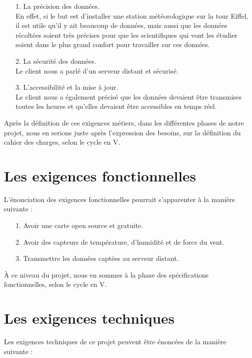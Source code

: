 \documentclass[titlepage]{article}
\begin{document}
	\begin{itemize}
		\item[1.] La précision des données. \\
		En effet, si le but est d'installer une station météorologique sur la tour Eiffel, il est utile qu'il y ait beaucoup de données, mais aussi que les données récoltées soient très précises pour que les scientifiques qui vont les étudier soient dans le plus grand confort pour travailler sur ces données.

		\item[2.] La sécurité des données. \\
		Le client nous a parlé d'un serveur distant et sécurisé.

		\item[3.] L'accessibilité et la mise à jour. \\
		Le client nous a également précisé que les données devaient être transmises toutes les heures et qu’elles devaient être accessibles en temps réel.
	\end{itemize}

	Après la définition de ces exigences métiers, dans les différentes phases de notre projet, nous en serions juste après l'expression des besoins, sur la définition du cahier des charges, selon le cycle en V.

	\section{Les exigences fonctionnelles}

	L’énonciation des exigences fonctionnelles pourrait s’apparenter à la manière suivante :

	\begin{itemize}
		\item[1.] Avoir une carte open source et gratuite.
		\item[2.] Avoir des capteurs de température, d'humidité et de force du vent.
		\item[3.] Transmettre les données captées au serveur distant.
	\end{itemize}

	À ce niveau du projet, nous en sommes à la phase des spécifications fonctionnelles, selon le cycle en V.

	\section{Les exigences techniques}

	Les exigences techniques de ce projet peuvent être énoncées de la manière suivante :
\end{document}
